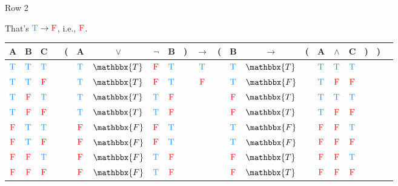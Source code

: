 \documentclass[
  ignorenonframetext,
]{beamer}
\renewcommand{\,}{\text{, }}
\def\True{\textcolor{dodgerblue}{\text{T}}}
\def\False{\textcolor{red}{\text{F}}}
\begin{document}
\begin{frame}{Row 2}
\protect\hypertarget{row-2-1}{}

That's \(\True \rightarrow \False\), i.e., \(\False\).

\begin{center}
\bigskip
\begin{tabular}{@{ }c@{ }@{ }c@{ }@{ }c | c@{ }@{}c@{}@{ }c@{ }@{ }c@{ }@{ }c@{ }@{ }c@{ }@{}c@{}@{ }c@{ }@{}c@{}@{ }c@{ }@{ }c@{ }@{}c@{}@{ }c@{ }@{ }c@{ }@{ }c@{ }@{}c@{}@{}c@{}@{ }c}
A & B & C &  & ( & A & $\vee$ & $\neg$ & B & ) & $\rightarrow$ & ( & B & $\rightarrow$ & ( & A & $\wedge$ & C & ) & ) & \\
\hline 
 $\True$ & $\True$ & $\True$ &  &  & $\True$ & $\mathbbx{T}$ & $\False$ & $\True$ &  &\textcolor{red}{$\True$}&  & $\True$ & $\mathbbx{T}$ &  & $\True$ & $\True$ & $\True$ &  &  & \\
 $\True$ & $\True$ & $\False$ &  &  & $\True$ & $\mathbbx{T}$ & $\False$ & $\True$ &  &\textcolor{red}{$\False$}&  & $\True$ & $\mathbbx{F}$ &  & $\True$ & $\False$ & $\False$ &  &  & \\
 $\True$ & $\False$ & $\True$ &  &  & $\True$ & $\mathbbx{T}$ & $\True$ & $\False$ &  &&  & $\False$ & $\mathbbx{T}$ &  & $\True$ & $\True$ & $\True$ &  &  & \\
 $\True$ & $\False$ & $\False$ &  &  & $\True$ & $\mathbbx{T}$ & $\True$ & $\False$ &  &&  & $\False$ & $\mathbbx{T}$ &  & $\True$ & $\False$ & $\False$ &  &  & \\
 $\False$ & $\True$ & $\True$ &  &  & $\False$ & $\mathbbx{F}$ & $\False$ & $\True$ &  &&  & $\True$ & $\mathbbx{F}$ &  & $\False$ & $\False$ & $\True$ &  &  & \\
 $\False$ & $\True$ & $\False$ &  &  & $\False$ & $\mathbbx{F}$ & $\False$ & $\True$ &  &&  & $\True$ & $\mathbbx{F}$ &  & $\False$ & $\False$ & $\False$ &  &  & \\
 $\False$ & $\False$ & $\True$ &  &  & $\False$ & $\mathbbx{F}$ & $\True$ & $\False$ &  &&  & $\False$ & $\mathbbx{T}$ &  & $\False$ & $\False$ & $\True$ &  &  & \\
 $\False$ & $\False$ & $\False$ &  &  & $\False$ & $\mathbbx{F}$ & $\True$ & $\False$ &  &&  & $\False$ & $\mathbbx{T}$ &  & $\False$ & $\False$ & $\False$ &  &  & \\
\end{tabular}
\bigskip
\end{center}

\end{frame}
\end{document}
